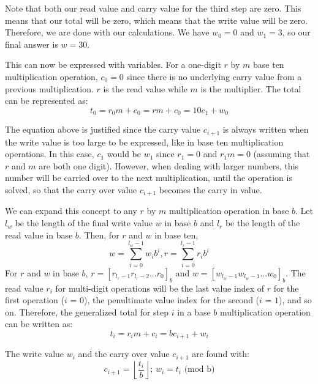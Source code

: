 \documentclass{article}
\begin{document}
Note that both our read value and carry value for the third step are zero. This means that our total will be zero, which means that the write value will be zero. Therefore, we are done with our calculations. We have $w_0 = 0$ and $w_1 = 3$, so our final answer is $w = 30$. \vspace{\baselineskip}

This can now be expressed with variables. For a one-digit $r$ by $m$ base ten multiplication operation, $c_0 = 0$ since there is no underlying carry value from a previous multiplication. $r$ is the read value while $m$ is the multiplier. The total can be represented as: \begin{equation} t_0 = r_0m + c_0 = rm + c_0 = 10c_1 + w_0\end{equation} 

 The equation above is justified since the carry value $c_{i+1}$ is always written when the write value is too large to be expressed, like in base ten multiplication operations. In this case, $c_1$ would be $w_1$ since $r_1 = 0$ and $r_1m = 0$ (assuming that $r$ and $m$ are both one digit). However, when dealing with larger numbers, this number will be carried over to the next multiplication, until the operation is solved, so that the carry over value $c_{i+1}$ becomes the carry in value. \vspace{\baselineskip}
 
 We can expand this concept to any $r$ by $m$ multiplication operation in base $b$. Let $l_w$ be the length of the final write value $w$ in base $b$ and $l_r$ be the length of the read value in base $b$. Then, for $r$ and $w$ in base ten,
 \begin{equation}
     w = \sum_{i=0}^{l_w - 1} w_ib^{i}, r = \sum_{i=0}^{l_r - 1} r_ib^{i}
 \end{equation} For $r$ and $w$ in base $b$, $r = [r_{l_r-1}r_{l_r-2}...r_0]_b$ and $w = [w_{l_w-1}w_{l_w-1}...w_0]_b$. The read value $r_i$ for multi-digit operations will be the last value index of $r$ for the first operation ($i$ = $0$), the penultimate value index for the second ($i$ = $1$), and so on. Therefore, the generalized total for step $i$ in a base $b$ multiplication operation can be written as: \begin{equation} t_i = r_im + c_i = bc_{i+1} + w_i\end{equation}
 
 The write value $w_i$ and the carry over value $c_{i+1}$ are found with: \begin{equation} c_{i+1} = \left \lfloor{\frac{t_i}{b}} \right \rfloor \text{; } w_i = t_i \text{ (mod b)} \end{equation}
 
\end{document}
